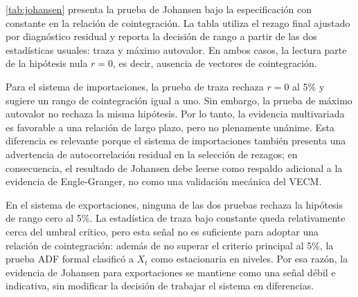 \documentclass[11pt,a4paper]{article}
\begin{document}
	\autoref{tab:johansen} presenta la prueba de Johansen bajo la especificación
	con constante en la relación de cointegración. La tabla utiliza el rezago final
	ajustado por diagnóstico residual y reporta la decisión de rango a partir de
	las dos estadísticas usuales: traza y máximo autovalor. En ambos casos, la
	lectura parte de la hipótesis nula \(r=0\), es decir, ausencia de vectores de
	cointegración.

	\begin{table}[H]
		\centering
		\caption{Pruebas de cointegración de Johansen: especificación con constante.}
		\label{tab:johansen}
		\small
		\caption*{\footnotesize Nota: el asterisco indica rechazo al 5\% de la hipótesis
			nula \(r=0\). Los valores críticos al 5\% son 34.91 para la prueba de traza y
			22.00 para la prueba de máximo autovalor bajo la especificación utilizada.}
	\end{table}

	Para el sistema de importaciones, la prueba de traza rechaza \(r=0\) al 5\%
	y sugiere un rango de cointegración igual a uno. Sin embargo, la prueba de
	máximo autovalor no rechaza la misma hipótesis. Por lo tanto, la evidencia
	multivariada es favorable a una relación de largo plazo, pero no plenamente
	unánime. Esta diferencia es relevante porque el sistema de importaciones
	también presenta una advertencia de autocorrelación residual en la selección de
	rezagos; en consecuencia, el resultado de Johansen debe leerse como respaldo
	adicional a la evidencia de Engle-Granger, no como una validación mecánica del
	VECM.

	En el sistema de exportaciones, ninguna de las dos pruebas rechaza la hipótesis
	de rango cero al 5\%. La estadística de traza bajo constante queda relativamente
	cerca del umbral crítico, pero esta señal no es suficiente para adoptar una
	relación de cointegración: además de no superar el criterio principal al 5\%,
	la prueba ADF formal clasificó a \(X_t\) como estacionaria en niveles. Por esa
	razón, la evidencia de Johansen para exportaciones se mantiene como una señal
	débil e indicativa, sin modificar la decisión de trabajar el sistema en
	diferencias.
\end{document}

